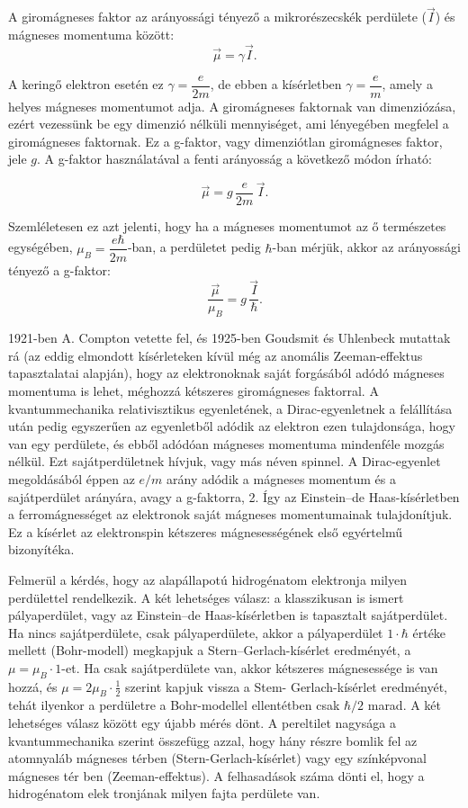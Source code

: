 \documentclass[../main.tex]{subfiles}
\begin{document}
A giromágneses faktor az arányossági tényező a mikrorészecskék perdülete
($\vec{I}$) és mágneses momentuma között:
\begin{equation}
\vec{\mu} = \gamma \vec{I}.
\end{equation}

A keringő elektron esetén ez $\gamma=\dfrac{e}{2m}$, de ebben a
kísérletben $\gamma=\dfrac{e}{m}$, amely a helyes mágneses momentumot adja.
A giromágneses faktornak van dimenziózása, ezért vezessünk be egy
dimenzió nélküli mennyiséget, ami lényegében megfelel a giromágneses faktornak.
Ez a g-faktor, vagy dimenziótlan giromágneses faktor, jele $g$.
A g-faktor használatával a fenti arányosság a következő módon írható:

\begin{equation}
\vec{\mu} = g\,\frac{e}{2m}\,\vec{I}.
\tag{6.3}
\end{equation}

Szemléletesen ez azt jelenti, hogy ha a mágneses momentumot az ő
természetes egységében, $\mu_B=\dfrac{e\hbar}{2m}$-ban, a perdületet
pedig $\hbar$-ban mérjük, akkor az arányossági tényező a g-faktor:
\begin{equation}
\frac{\vec{\mu}}{\mu_B} = g\,\frac{\vec{I}}{\hbar}.
\end{equation}

1921-ben A. Compton vetette fel, és 1925-ben Goudsmit és Uhlenbeck
mutattak rá (az eddig elmondott kísérleteken kívül még az anomális
Zeeman-effektus tapasztalatai alapján), hogy az elektronoknak saját
forgásából adódó mágneses momentuma is lehet, méghozzá kétszeres
giromágneses faktorral.
A kvantummechanika relativisztikus egyenletének, a Dirac-egyenletnek a
felállítása után pedig egyszerűen az egyenletből adódik az elektron ezen
tulajdonsága, hogy van egy perdülete, és ebből adódóan mágneses momentuma
mindenféle mozgás nélkül.
Ezt sajátperdületnek hívjuk, vagy más néven spinnel.
A Dirac-egyenlet megoldásából éppen az $e/m$ arány adódik a mágneses
momentum és a sajátperdület arányára, avagy a g-faktorra, 2.
Így az Einstein–de Haas-kísérletben a ferromágnességet az elektronok
saját mágneses momentumainak tulajdonítjuk.
Ez a kísérlet az elektronspin kétszeres mágnesességének első egyértelmű
bizonyítéka.

Felmerül a kérdés, hogy az alapállapotú hidrogénatom elektronja milyen
perdülettel rendelkezik.
A két lehetséges válasz: a klasszikusan is ismert pályaperdület, vagy az
Einstein–de Haas-kísérletben is tapasztalt sajátperdület.
Ha nincs sajátperdülete, csak pályaperdülete, akkor a pályaperdület
$1 \cdot \hbar$ értéke mellett (Bohr-modell) megkapjuk a Stern–Gerlach-kísérlet
eredményét, a $\mu=\mu_B\cdot 1$-et.
Ha csak sajátperdülete van, akkor kétszeres mágnesessége is van hozzá,
és $\mu=2\mu_B\cdot\frac{1}{2}$ szerint kapjuk vissza a Stem- Gerlach-kísérlet eredményét, tehát ilyenkor a perdületre a Bohr-modellel ellentétben csak $\hbar/2$ marad. A két lehetséges válasz között egy
újabb mérés dönt. A pereltilet nagysága a kvantummechanika szerint összefügg azzal, hogy hány részre bomlik fel az atomnyaláb mágneses térben
(Stern-Gerlach-kísérlet) vagy egy színképvonal mágneses tér ben (Zeeman-effektus). A felhasadások száma dönti el, hogy a hidrogénatom elek tronjának milyen fajta perdülete van.
\end{document}
